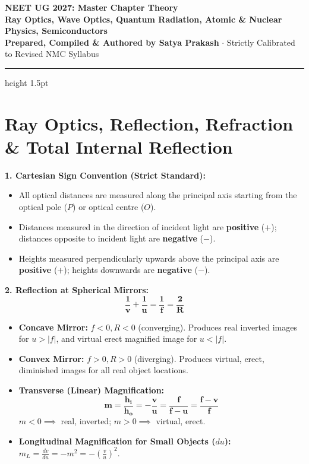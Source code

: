 \documentclass[10pt,a4paper]{article}
\begin{document}
\begin{center}
  {\Huge \textbf{NEET UG 2027: Master Chapter Theory}}\\[6pt]
  {\Large \textbf{Ray Optics, Wave Optics, Quantum Radiation, Atomic \& Nuclear Physics, Semiconductors}}\\[4pt]
  {\small \textbf{Prepared, Compiled \& Authored by Satya Prakash} $\cdot$ Strictly Calibrated to Revised NMC Syllabus}
  \vspace{4pt}
  \hrule height 1.5pt
\end{center}

\section{Ray Optics, Reflection, Refraction \& Total Internal Reflection}

\begin{conceptbox}
\textbf{1. Cartesian Sign Convention (Strict Standard):}
\begin{itemize}
  \item All optical distances are measured along the principal axis starting from the optical pole ($P$) or optical centre ($O$).
  \item Distances measured in the direction of incident light are \textbf{positive} ($+$); distances opposite to incident light are \textbf{negative} ($-$).
  \item Heights measured perpendicularly upwards above the principal axis are \textbf{positive} ($+$); heights downwards are \textbf{negative} ($-$).
\end{itemize}
\textbf{2. Reflection at Spherical Mirrors:}
\begin{equation}
  \mathbf{\frac{1}{v} + \frac{1}{u} = \frac{1}{f} = \frac{2}{R}}
\end{equation}
\begin{itemize}
  \item \textbf{Concave Mirror:} $f < 0, R < 0$ (converging). Produces real inverted images for $u > |f|$, and virtual erect magnified image for $u < |f|$.
  \item \textbf{Convex Mirror:} $f > 0, R > 0$ (diverging). Produces virtual, erect, diminished images for all real object locations.
  \item \textbf{Transverse (Linear) Magnification:}
  \begin{equation}
    \mathbf{m = \frac{h_i}{h_o} = -\frac{v}{u} = \frac{f}{f - u} = \frac{f - v}{f}}
  \end{equation}
  $m < 0 \implies$ real, inverted; $m > 0 \implies$ virtual, erect.
  \item \textbf{Longitudinal Magnification for Small Objects ($du$):} $m_L = \frac{dv}{du} = -m^2 = -\left(\frac{v}{u}\right)^2$.
\end{itemize}
\end{conceptbox}
\end{document}
